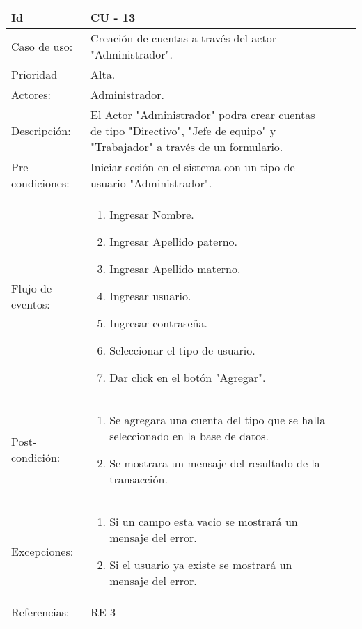 \documentclass[11pt,a4paper]{article}
\begin{document}
\begin{tabular}[c]{|p{3cm}|p{13cm}|p{2.5cm}|p{3cm}|}
\hline 
\rule[-1ex]{0pt}{2.5ex} Id & CU - 13 \\ 
\hline 
\rule[-1ex]{0pt}{2.5ex} Caso de uso: & Creación de cuentas a través del actor "Administrador".\\ 
\hline 
\rule[-1ex]{0pt}{2.5ex} Prioridad & Alta. \\ 
\hline 
\rule[-1ex]{0pt}{2.5ex} Actores: & Administrador. \\ 
\hline 
\rule[-1ex]{0pt}{2.5ex} Descripción: & El Actor "Administrador" podra crear cuentas de tipo "Directivo", "Jefe de equipo" y "Trabajador" a través de un formulario.\\ 
\hline 
\rule[-1ex]{0pt}{2.5ex} Pre-condiciones: & Iniciar sesión en el sistema con un tipo de usuario "Administrador". \\ 
\hline 
\rule[-1ex]{0pt}{2.5ex} Flujo de eventos: & \begin{enumerate}
\item Ingresar Nombre.
\item Ingresar Apellido paterno.
\item Ingresar Apellido materno.
\item Ingresar usuario.
\item Ingresar contraseña.
\item Seleccionar el tipo de usuario.
\item Dar click en el botón "Agregar".
\end{enumerate} \\ 
\hline 
\rule[-1ex]{0pt}{2.5ex} Post-condición: & \begin{enumerate}
\item Se agregara una cuenta del tipo que se halla seleccionado en la base de datos.
\item Se mostrara un mensaje del resultado de la transacción.
\end{enumerate} \\ 
\hline 
\rule[-1ex]{0pt}{2.5ex} Excepciones: & \begin{enumerate}
\item Si un campo esta vacio se mostrará un mensaje del error.
\item Si el usuario ya existe se mostrará un mensaje del error.
\end{enumerate} \\ 
\hline 
\rule[-1ex]{0pt}{2.5ex} Referencias: & RE-3\\ 
\hline 
\end{tabular} 
\\
\end{document}
